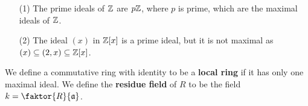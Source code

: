 \begin{example}\label{1.17}
    \begin{enumerate}
        \item[(1)] The prime ideals of $\mathbb{Z}$ are $p\mathbb{Z}$, where $p$ is prime, which
            are the maximal ideals of $\mathbb{Z}$.

        \item[(2)] The ideal $(x)$ in $\mathbb{Z}[x]$ is a prime ideal, but it is not
            maximal as $(x) \subseteq (2,x) \subseteq \mathbb{Z}[x]$.
    \end{enumerate}
\end{example}

\begin{definition}
    We define a commutative ring with identity to be a \textbf{local ring} if it
    has only one maximal ideal. We define the \textbf{residue field} of $R$ to
    be the field $k=\faktor{R}{\af}$.
\end{definition}
